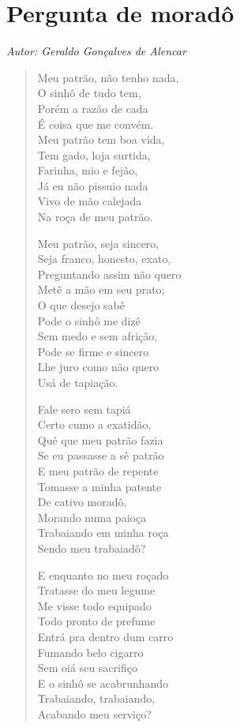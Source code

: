 \chapter{Pergunta de moradô}

\begin{flushright}
\emph{Autor: Geraldo Gonçalves de Alencar}
\end{flushright}


\begin{verse}
Meu patrão, não tenho nada,\\
O sinhô de tudo tem,\\
Porém a razão de cada\\
É coisa que me convém.\\
Meu patrão tem boa vida,\\
Tem gado, loja surtida,\\
Farinha, mio e fejão,\\
Já eu não pissuio nada\\
Vivo de mão calejada\\
Na roça de meu patrão.

Meu patrão, seja sincero,\\
Seja franco, honesto, exato,\\
Preguntando assim não quero\\
Metê a mão em seu prato;\\
O que desejo sabê\\
Pode o sinhô me dizê\\
Sem medo e sem afrição,\\
Pode se firme e sincero\\
Lhe juro como não quero\\
Usá de tapiação.

Fale sero sem tapiá\\
Certo cumo a exatidão,\\
Qué que meu patrão fazia\\
Se eu passasse a sê patrão\\
E meu patrão de repente\\
Tomasse a minha patente\\
De cativo moradô,\\
Morando numa paioça\\
Trabaiando em minha roça\\
Sendo meu trabaiadô?

E enquanto no meu roçado\\
Tratasse do meu legume\\
Me visse todo equipado\\
Todo pronto de prefume\\
Entrá pra dentro dum carro\\
Fumando belo cigarro\\
Sem oiá seu sacrifiço\\
E o sinhô se acabrunhando\\
Trabaiando, trabaiando,\\
Acabando meu serviço?


\end{verse}
